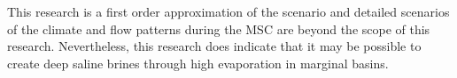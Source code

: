 \documentclass[twocolumn]{article}
\begin{document}
This research is a first order approximation of the scenario and detailed scenarios of the climate and flow patterns during the MSC are beyond the scope of this research. Nevertheless, this research does indicate that it may be possible to create deep saline brines through high evaporation in marginal basins.




\clearpage
\pagebreak

\end{document}
